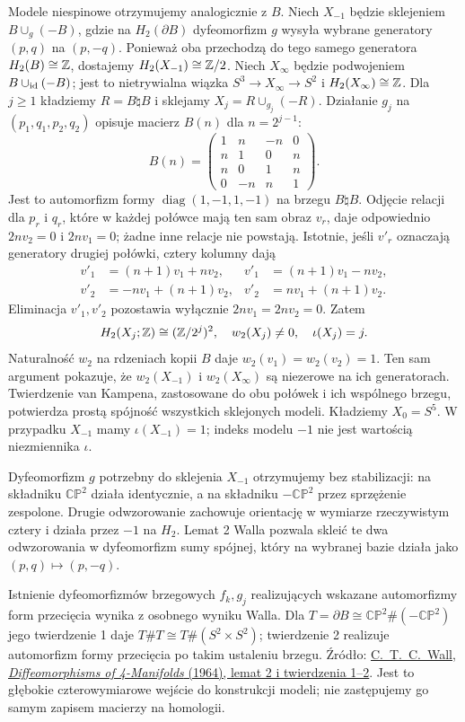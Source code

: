 Modele niespinowe otrzymujemy
analogicznie z $B$.
Niech $X_{-1}$ będzie sklejeniem
$B\cup_g(-B)$, gdzie na
$H_2(\partial B)$ dyfeomorfizm $g$
wysyła wybrane generatory $(p,q)$
na $(p,-q)$. Ponieważ oba przechodzą
do tego samego generatora
$H_2(B)\cong\mathbb{Z}$, dostajemy
$H_2(X_{-1})\cong\mathbb{Z}/2$.
Niech $X_\infty$ będzie podwojeniem
$B\cup_{\mathrm{id}}(-B)$;
jest to nietrywialna wiązka
$S^3\to X_\infty\to S^2$ i
$H_2(X_\infty)\cong\mathbb{Z}$.
Dla $j\geq1$ kładziemy $R=B\natural B$
i sklejamy $X_j=R\cup_{g_j}(-R)$.
Działanie $g_j$ na
$(p_1,q_1,p_2,q_2)$ opisuje
macierz $B(n)$ dla $n=2^{j-1}$:
\[
 B(n)=\begin{pmatrix}
 1&n&-n&0\\ n&1&0&n\\
 n&0&1&n\\0&-n&n&1
 \end{pmatrix}.
\]
Jest to automorfizm formy
$\operatorname{diag}(1,-1,1,-1)$
na brzegu $B\natural B$.
Odjęcie relacji dla
$p_r$ i $q_r$, które w każdej
połówce mają ten sam obraz $v_r$,
daje odpowiednio $2nv_2=0$
i $2nv_1=0$; żadne inne relacje
nie powstają. Istotnie, jeśli $v'_r$ oznaczają
generatory drugiej połówki, cztery kolumny dają
\[
\begin{aligned}
 v'_1&=(n+1)v_1+nv_2,&
 v'_1&=(n+1)v_1-nv_2,\\
 v'_2&=-nv_1+(n+1)v_2,&
 v'_2&=nv_1+(n+1)v_2.
\end{aligned}
\]
Eliminacja $v'_1,v'_2$ pozostawia wyłącznie
$2nv_1=2nv_2=0$.
Zatem
\[
 H_2(X_j;\mathbb{Z})\cong(\mathbb{Z}/2^j)^2,
 \quad w_2(X_j)\ne0,\quad
 \iota(X_j)=j.
\]
Naturalność $w_2$ na rdzeniach
kopii $B$ daje $w_2(v_1)=w_2(v_2)=1$.
Ten sam argument pokazuje, że
$w_2(X_{-1})$ i $w_2(X_\infty)$
są niezerowe na ich generatorach.
Twierdzenie van Kampena, zastosowane
do obu połówek i ich wspólnego brzegu,
potwierdza prostą spójność wszystkich
sklejonych modeli.
Kładziemy $X_0=S^5$.
W przypadku $X_{-1}$ mamy
$\iota(X_{-1})=1$;
indeks modelu $-1$ nie jest
wartością niezmiennika $\iota$.

Dyfeomorfizm $g$ potrzebny do sklejenia
$X_{-1}$ otrzymujemy bez stabilizacji:
na składniku $\mathbb{CP}^2$ działa
identycznie, a na składniku
$-\mathbb{CP}^2$ przez sprzężenie zespolone.
Drugie odwzorowanie zachowuje orientację
w wymiarze rzeczywistym cztery i działa
przez $-1$ na $H_2$. Lemat 2 Walla
pozwala skleić te dwa odwzorowania
w dyfeomorfizm sumy spójnej, który
na wybranej bazie działa jako $(p,q)\mapsto(p,-q)$.

Istnienie dyfeomorfizmów brzegowych
$f_k,g_j$ realizujących wskazane
automorfizmy form przecięcia wynika
z osobnego wyniku Walla. Dla
$T=\partial B\cong\mathbb{CP}^2\#(-\mathbb{CP}^2)$
jego twierdzenie 1 daje
$T\#T\cong T\#(S^2\times S^2)$;
twierdzenie 2 realizuje automorfizm
formy przecięcia po takim ustaleniu
brzegu. Źródło:
\href{https://webhomes.maths.ed.ac.uk/~v1ranick/papers/wdiff4.pdf}
{C.\ T.\ C.\ Wall, \emph{Diffeomorphisms
of 4-Manifolds} (1964), lemat 2
i twierdzenia 1--2}.
Jest to głębokie czterowymiarowe
wejście do konstrukcji modeli;
nie zastępujemy go samym zapisem
macierzy na homologii.

